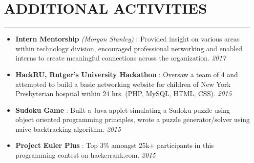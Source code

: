 \documentclass[12pt]{article}
\newcommand{\sectionHeading}[1]{
\vspace{-15pt}
\section*{\small{#1}}
\vspace{-10pt}
\hrule
\vspace{8pt}
}
\newcommand {\extracurricularSectionSubheading}[3]{
    \noindent \small{\textbf{#1} : #2 \hfill \textit{#3}} \\
    \vspace{-10pt}
}
\newcommand{\sectionListStart}{
    \begin{itemize}[label={\small{\textbullet}}, leftmargin=20pt] %
}
\newcommand{\sectionListStartWiderSpacing}{
    \begin{itemize}[label={\small{\textbullet}}, leftmargin=20pt, itemsep=-2pt] %
}
\newcommand{\sectionListStartNoBulletWiderSpacing}{
    \begin{itemize}[label={}, leftmargin=0pt, itemsep=-2pt] %
}
\newcommand{\sectionListEnd}{\end{itemize} \vspace{-5pt}}
\newcommand{\sectionListItem}[1]{\item \small{#1}}
\newcommand{\sectionListItemWithDate}[2]{\item \small{#1 \hfill \textit{#2}}}
\begin{document}
\sectionHeading{ADDITIONAL ACTIVITIES}


\sectionListStartWiderSpacing
\sectionListItemWithDate{\textbf{Intern Mentorship} \textit{(Morgan Stanley)} : Provided insight on various areas within technology division, encouraged professional networking and enabled interns to create meaningful connections across the organization.}{2017}

\sectionListItemWithDate{\textbf{HackRU, Rutger's University Hackathon} : Oversaw a team of 4 and attempted to build a basic networking website for children of New York Presbyterian hospital within 24 hrs. (PHP, MySQL, HTML, CSS).}{2015}

\sectionListItemWithDate{\textbf{Sudoku Game} : Built a Java applet simulating a Sudoku puzzle using object oriented programming principles, wrote a puzzle generator/solver using naive backtracking algorithm.}{2015}


\sectionListItemWithDate{\textbf{Project Euler Plus} : Top 3\% amongst 25k+ participants in this programming contest on hackerrank.com.}{2015}



\sectionListEnd

\end{document}
